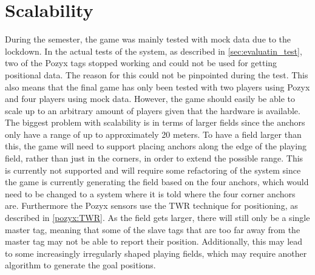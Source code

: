 \section{Scalability}
During the semester, the game was mainly tested with mock data due to the lockdown.
In the actual tests of the system, as described in \autoref{sec:evaluatin_test}, two of the Pozyx tags stopped working and could not be used for getting positional data.
The reason for this could not be pinpointed during the test.
This also means that the final game has only been tested with two players using Pozyx and four players using mock data.
However, the game should easily be able to scale up to an arbitrary amount of players given that the hardware is available.\\
The biggest problem with scalability is in terms of larger fields since the anchors only have a range of up to approximately 20 meters.
To have a field larger than this, the game will need to support placing anchors along the edge of the playing field, rather than just in the corners, in order to extend the possible range.
This is currently not supported and will require some refactoring of the system since the game is currently generating the field based on the four anchors, which would need to be changed to a system where it is told where the four corner anchors are.
Furthermore the Pozyx sensors use the TWR technique for positioning, as described in \autoref{pozyx:TWR}.
As the field gets larger, there will still only be a single master tag, meaning that some of the slave tags that are too far away from the master tag may not be able to report their position.
Additionally, this may lead to some increasingly irregularly shaped playing fields, which may require another algorithm to generate the goal positions.
